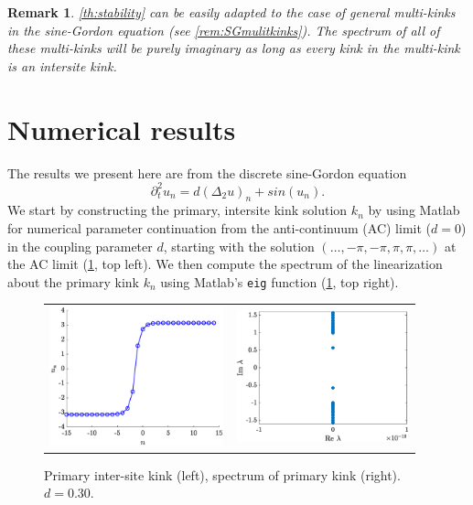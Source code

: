 \documentclass[12pt,reqno]{amsart}
\newtheorem{remark}{Remark}
\begin{document}
\begin{remark}
\cref{th:stability} can be easily adapted to the case of general multi-kinks in the sine-Gordon equation (see \cref{rem:SGmulitkinks}). The spectrum of all of these multi-kinks will be purely imaginary as long as every kink in the multi-kink is an intersite kink.
\end{remark}

\section{Numerical results}

The results we present here are from the discrete sine-Gordon equation
\begin{equation}\label{eq:dSG}
	\partial_t^2 u_n = d (\Delta_2 u)_n + sin(u_n).
\end{equation}
We start by constructing the primary, intersite kink solution $k_n$ by using Matlab for numerical parameter continuation from the anti-continuum (AC) limit ($d = 0$) in the coupling parameter $d$, starting with the solution $(\dots, -\pi, -\pi, \pi, \pi, \dots)$ at the AC limit (\cref{fig:kink}, top left). We then compute the spectrum of the linearization about the primary kink $k_n$ using Matlab's \texttt{eig} function (\cref{fig:kink}, top right).

\begin{figure}[H]
\begin{center}
\begin{tabular}{cc}
\includegraphics[width=5cm]{1kink.eps}	&
\includegraphics[width=5cm]{1kinkspectrum.eps} 
\end{tabular}
\end{center}
\caption{Primary inter-site kink (left), spectrum of primary kink (right). $d = 0.30$.}
\label{fig:kink}
\end{figure}
\end{document}

